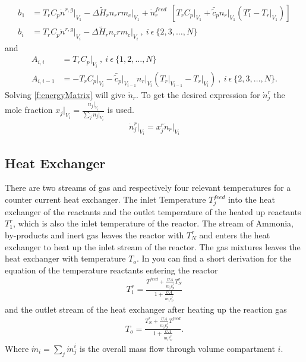 \documentclass[paper=letter, fontsize=12pt]{article}
\begin{document}
\begin{align}
b_1&= T_r C_p \dot{n}^{r,g} \Big|_{V_1} - \Delta \tilde{H}_r n_r r m_c \Big|_{V_1} + \dot{n}^{feed}_r\ \ \left[ T_r C_p \Big|_{V_1} + \bar{\tilde{c}}_p  n_r\Big|_{V_1} \left( T^{r}_1 - T_r\Big|_{V_1} \right) \right] \\
b_i&= T_r C_p \dot{n}^{r,g} \Big|_{V_i} - \Delta \tilde{H}_r n_r r m_c \Big|_{V_i}\ ,\ i\ \epsilon\  \{ 2,3,\dots ,N\}
\end{align}
and
\begin{align}
A_{i,i}&=T_r C_p\Big|_{V_i}\ , \ i\ \epsilon\  \{ 1,2,\dots ,N\}\\
A_{i,i-1}&=-T_r C_p \Big|_{V_i} - \bar{\tilde{c}}_p\Big|_{V_{i-1}} n_r\Big|_{V_i} \left(T_r\Big|_{V_{i-1}} - T_r \Big|_{V_i} \right)\ , \ i\ \epsilon\  \{ 2,3,\dots ,N\}.
\end{align}
Solving \autoref{f:energyMatrix} will give $\dot{n}_r$. To get the desired expression for $\dot{n}^r_j$ the mole fraction $x_j \Big|_{V_i}=\frac{n_j \Big|_{V_i}}{\sum_j n_j \Big|_{V_i}}$ is used.
\begin{align}
\dot{n}^r_j \Big|_{V_i} =x^r_j \dot{n}_r \Big|_{V_i} \label{f:molarOutlet}
\end{align}

\subsection{Heat Exchanger}
There are two streams of gas and respectively four relevant temperatures for a counter current heat exchanger. The inlet Temperature $T^{feed}_j$ into the heat exchanger of the reactants and the outlet temperature of the heated up reactants $T^r_1$, which is also the inlet temperature of the reactor. The stream of Ammonia, by-products and inert gas leaves the reactor with $T^r_N$ and enters the heat exchanger to heat up the inlet stream of the reactor. The gas mixtures leaves the heat exchanger with temperature $T_o$. In \cite{Jinasena2016} you can find a short derivation for the equation of the temperature reactants entering the reactor
\begin{align}
T^r_1=\frac{T^{feed} + \frac{U A}{\dot{m}_i \hat{c}^i_p} T^r_N}{1 + \frac{U A}{\dot{m}_i \hat{c}^i_p}} \label{f:tempInReact}
\end{align}
and the outlet stream of the heat exchanger after heating up the reaction gas
\begin{align}
T_o=\frac{T^r_N + \frac{U A}{\dot{m}_i \hat{c}^i_p} T^{feed}}{1+ \frac{U A}{\dot{m}_i \hat{c}^i_p}}. \label{f:tempOutExchanger}
\end{align}
Where $\dot{m}_i=\sum_j \dot{m}^i_j$ is the overall mass flow through volume compartment $i$.
\end{document}
